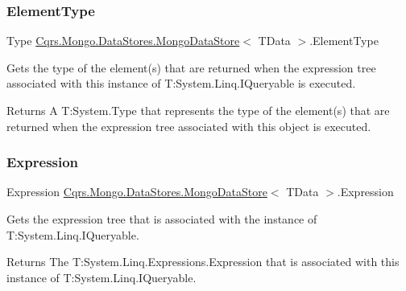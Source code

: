 \subsubsection{\texorpdfstring{Element\+Type}{ElementType}}
{\footnotesize\ttfamily Type \hyperlink{classCqrs_1_1Mongo_1_1DataStores_1_1MongoDataStore}{Cqrs.\+Mongo.\+Data\+Stores.\+Mongo\+Data\+Store}$<$ T\+Data $>$.Element\+Type\hspace{0.3cm}{\ttfamily [get]}}



Gets the type of the element(s) that are returned when the expression tree associated with this instance of T\+:\+System.\+Linq.\+I\+Queryable is executed. 

\begin{DoxyReturn}{Returns}
A T\+:\+System.\+Type that represents the type of the element(s) that are returned when the expression tree associated with this object is executed. 
\end{DoxyReturn}
\mbox{\label{classCqrs_1_1Mongo_1_1DataStores_1_1MongoDataStore_a1a151694ae4eef805bd64aa7a3ae70ed_a1a151694ae4eef805bd64aa7a3ae70ed}} 
\subsubsection{\texorpdfstring{Expression}{Expression}}
{\footnotesize\ttfamily Expression \hyperlink{classCqrs_1_1Mongo_1_1DataStores_1_1MongoDataStore}{Cqrs.\+Mongo.\+Data\+Stores.\+Mongo\+Data\+Store}$<$ T\+Data $>$.Expression\hspace{0.3cm}{\ttfamily [get]}}



Gets the expression tree that is associated with the instance of T\+:\+System.\+Linq.\+I\+Queryable. 

\begin{DoxyReturn}{Returns}
The T\+:\+System.\+Linq.\+Expressions.\+Expression that is associated with this instance of T\+:\+System.\+Linq.\+I\+Queryable. 
\end{DoxyReturn}
\mbox{\label{classCqrs_1_1Mongo_1_1DataStores_1_1MongoDataStore_a29e943482b60be2d3d253af59d3fc5eb_a29e943482b60be2d3d253af59d3fc5eb}} 
